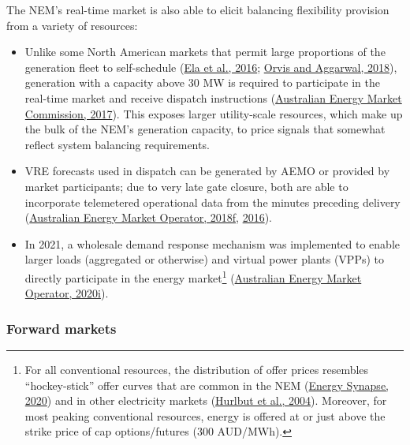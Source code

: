 \documentclass[12pt,a4paper,]{report}
\providecommand{\tightlist}{%
  \setlength{\itemsep}{0pt}\setlength{\parskip}{0pt}}
\begin{document}
The NEM's real-time market is also able to elicit balancing flexibility
provision from a variety of resources:

\begin{itemize}
\tightlist
\item
  Unlike some North American markets that permit large proportions of
  the generation fleet to self-schedule
  (\protect\hyperlink{ref-elaWholesaleElectricityMarket2016}{Ela et al.,
  2016};
  \protect\hyperlink{ref-orvisRefiningCompetitiveElectricity2018}{Orvis
  and Aggarwal, 2018}), generation with a capacity above 30 MW is
  required to participate in the real-time market and receive dispatch
  instructions
  (\protect\hyperlink{ref-australianenergymarketcommissionNonscheduledGenerationLoad2017}{Australian
  Energy Market Commission, 2017}). This exposes larger utility-scale
  resources, which make up the bulk of the NEM's generation capacity, to
  price signals that somewhat reflect system balancing requirements.
\item
  VRE forecasts used in dispatch can be generated by AEMO or provided by
  market participants; due to very late gate closure, both are able to
  incorporate telemetered operational data from the minutes preceding
  delivery
  (\protect\hyperlink{ref-australianenergymarketoperatorSemiScheduledGenerationDispatch2018}{Australian
  Energy Market Operator, 2018f},
  \protect\hyperlink{ref-australianenergymarketoperatorSchedulingErrorReport2016}{2016}).
\item
  In 2021, a wholesale demand response mechanism was implemented to
  enable larger loads (aggregated or otherwise) and virtual power plants
  (VPPs) to directly participate in the energy market\footnote{For all
    conventional resources, the distribution of offer prices resembles
    ``hockey-stick'' offer curves that are common in the NEM
    (\protect\hyperlink{ref-energysynapseDemandResponseNational2020}{Energy
    Synapse, 2020}) and in other electricity markets
    (\protect\hyperlink{ref-hurlbutProtectingMarketHockey2004}{Hurlbut
    et al., 2004}). Moreover, for most peaking conventional resources,
    energy is offered at or just above the strike price of cap
    options/futures (300 AUD/MWh).}
  (\protect\hyperlink{ref-australianenergymarketoperatorWholesaleDemandReponse2020}{Australian
  Energy Market Operator, 2020i}).
\end{itemize}

\hypertarget{forward-markets}{%
\subsubsection{Forward markets}\label{forward-markets}}
\end{document}
